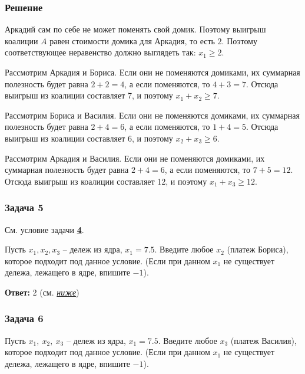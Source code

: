 	\subsubsection*{Решение}
	Аркадий сам по себе не может поменять свой домик. Поэтому выигрыш коалиции $A$ равен стоимости домика для Аркадия, то есть $2$. Поэтому соответствующее неравенство должно выглядеть так: $x_1 \geq 2$.
	
	Рассмотрим Аркадия и Бориса. Если они не поменяются домиками, их суммарная полезность будет равна $2+2=4$, а если поменяются, то $4+3=7$. Отсюда выигрыш из коалиции составляет 7, и поэтому $x_1+x_2 \geq 7$.
	
	Рассмотрим Бориса и Василия. Если они не поменяются домиками, их суммарная полезность будет равна $2+4=6$, а если поменяются, то $1+4=5$. Отсюда выигрыш из коалиции составляет 6, и поэтому $x_2+x_3 \geq 6$.
	
	Рассмотрим Аркадия и Василия. Если они не поменяются домиками, их суммарная полезность будет равна $2+4=6$, а если поменяются, то $7+5=12$. Отсюда выигрыш из коалиции составляет 12, и поэтому $x_1+x_3 \geq 12$.

	\subsubsection{Задача 5}
	См. условие задачи \hyperref[sec4]{\textbf{4}}.
	
	Пусть $x_1,x_2,x_3$ -- дележ из ядра, $x_1 = 7.5$. Введите любое $x_2$ (платеж Бориса), которое подходит под данное условие. (Если при данном $x_1$ не существует дележа, лежащего в ядре, впишите $-1$).
	
	\textbf{Ответ:} 2 (см. \hyperref[sec6:sol]{\textit{ниже}})
	
	\subsubsection{Задача 6}
	\label{sec6}
	Пусть $x_1,~x_2,~x_3$ -- дележ из ядра, $x_1 = 7.5$. Введите любое $x_3$ (платеж Василия), которое подходит под данное условие. (Если при данном $x_1$ не существует дележа, лежащего в ядре, впишите $-1$).
	
